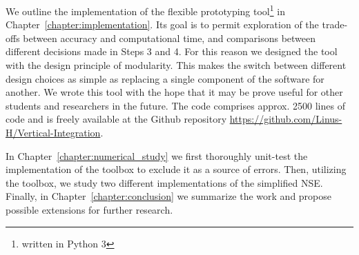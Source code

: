 We outline the implementation of the flexible prototyping tool\footnote{written in Python 3} in Chapter~\ref{chapter:implementation}.
Its goal is to permit exploration of the trade-offs between accuracy and computational time, and comparisons between different decisions made in Steps 3 and 4.
For this reason we designed the tool with the design principle of modularity.
This makes the switch between different design choices as simple as replacing a single component of the software for another.
We wrote this tool with the hope that it may be prove useful for other students and researchers in the future.
The code comprises approx. 2500 lines of code and is freely available at the Github repository \url{https://github.com/Linus-H/Vertical-Integration}.

In Chapter~\ref{chapter:numerical_study} we first thoroughly unit-test the implementation of the toolbox to exclude it as a source of errors.
Then, utilizing the toolbox, we study two different implementations of the simplified NSE.
Finally, in Chapter~\ref{chapter:conclusion} we summarize the work and propose possible extensions for further research.
